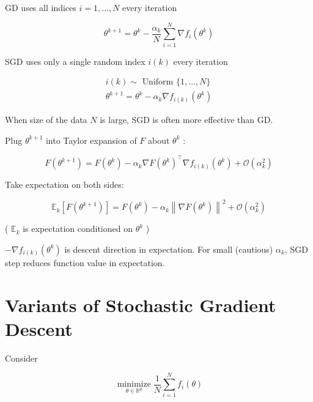 \begin{concept}
    GD uses all indices $i=1, \ldots, N$ every iteration

    $$
    \theta^{k+1}=\theta^{k}-\frac{\alpha_{k}}{N} \sum_{i=1}^{N} \nabla f_{i}\left(\theta^{k}\right)
    $$

    SGD uses only a single random index $i(k)$ every iteration

    $$
    \begin{gathered}
    i(k) \sim \text { Uniform }\{1, \ldots, N\} \\
    \theta^{k+1}=\theta^{k}-\alpha_{k} \nabla f_{i(k)}\left(\theta^{k}\right)
    \end{gathered}
    $$

    When size of the data $N$ is large, SGD is often more effective than GD.
\end{concept}

\begin{concept}
    Plug $\theta^{k+1}$ into Taylor expansion of $F$ about $\theta^{k}$ :

    $$
    F\left(\theta^{k+1}\right)=F\left(\theta^{k}\right)-\alpha_{k} \nabla F\left(\theta^{k}\right)^{\top} \nabla f_{i(k)}\left(\theta^{k}\right)+\mathcal{O}\left(\alpha_{k}^{2}\right)
    $$

    Take expectation on both sides:

    $$
    \mathbb{E}_{k}\left[F\left(\theta^{k+1}\right)\right]=F\left(\theta^{k}\right)-\alpha_{k}\left\|\nabla F\left(\theta^{k}\right)\right\|^{2}+\mathcal{O}\left(\alpha_{k}^{2}\right)
    $$

    ( $\mathbb{E}_{k}$ is expectation conditioned on $\theta^{k}$ )

    $-\nabla f_{i(k)}\left(\theta^{k}\right)$ is descent direction in expectation. For small (cautious) $\alpha_{k}$, SGD step reduces function value in expectation.
\end{concept}

\section{Variants of Stochastic Gradient Descent}

Consider

$$
\underset{\theta \in \mathbb{R}^{p}}{\operatorname{minimize}} \frac{1}{N} \sum_{i=1}^{N} f_{i}(\theta)
$$

